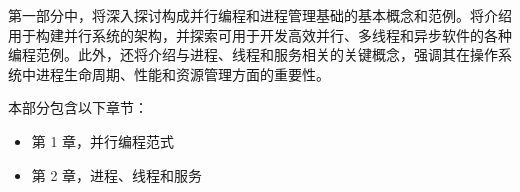 第一部分中，将深入探讨构成并行编程和进程管理基础的基本概念和范例。将介绍用于构建并行系统的架构，并探索可用于开发高效并行、多线程和异步软件的各种编程范例。此外，还将介绍与进程、线程和服务相关的关键概念，强调其在操作系统中进程生命周期、性能和资源管理方面的重要性。

本部分包含以下章节：

\begin{itemize}
\item
第 1 章，并行编程范式

\item
第 2 章，进程、线程和服务
\end{itemize}
